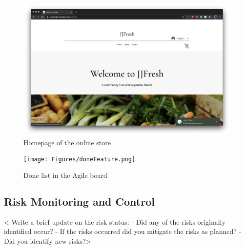 \documentclass{report}
\begin{document}
\begin{figure}[htp]
\centering
\includegraphics[width=\textwidth]{Figures/homepage.png}
\caption{Homepage of the online store}
\label{fig:homepage}
\end{figure}

\begin{figure}[htp]
\centering
\texttt{[image: Figures/doneFeature.png]}
\caption{Done list in the Agile board}
\label{fig:doneFeature}
\end{figure}

\clearpage
\subsection{Risk Monitoring and Control}
< Write a brief update on the risk status:
- Did any of the risks originally identified occur?
- If the risks occurred did you mitigate the risks as planned?
- Did you identify new risks?>
\end{document}
